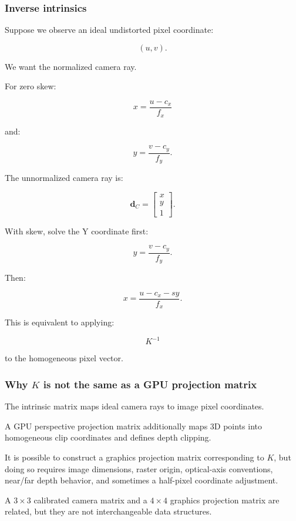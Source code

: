 \subsubsection{Inverse intrinsics}\label{inverse-intrinsics}

Suppose we observe an ideal undistorted pixel coordinate:

\[
 (u,v).
\]

We want the normalized camera ray.

For zero skew:

\[
 \boxed{ x=\frac{u-c_x}{f_x} }
\]

and:

\[
 \boxed{ y=\frac{v-c_y}{f_y} }.
\]

The unnormalized camera ray is:

\[
 \boxed{ \mathbf d_C= \begin{bmatrix} x\\y\\1 \end{bmatrix} }.
\]

With skew, solve the Y coordinate first:

\[
 y=\frac{v-c_y}{f_y}.
\]

Then:

\[
 \boxed{ x=\frac{u-c_x-sy}{f_x} }.
\]

This is equivalent to applying:

\[
 K^{-1}
\]

to the homogeneous pixel vector.

\subsubsection{\texorpdfstring{Why \(K\) is not the same as a GPU projection matrix}{Why K is not the same as a GPU projection matrix}}\label{why-k-is-not-the-same-as-a-gpu-projection-matrix}

The intrinsic matrix maps ideal camera rays to image pixel coordinates.

A GPU perspective projection matrix additionally maps 3D points into homogeneous clip coordinates and defines depth clipping.

It is possible to construct a graphics projection matrix corresponding to \(K\), but doing so requires image dimensions, raster origin, optical-axis conventions, near/far depth behavior, and sometimes a half-pixel coordinate adjustment.

A \(3\times3\) calibrated camera matrix and a \(4\times4\) graphics projection matrix are related, but they are not interchangeable data structures.

